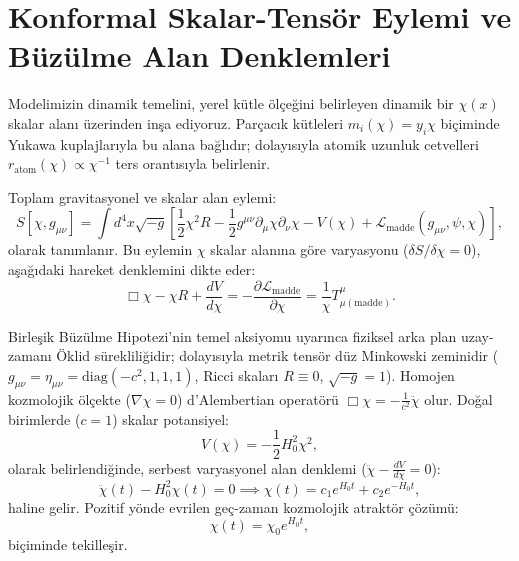 \documentclass[11pt,a4paper]{article}
\begin{document}
\section{Konformal Skalar-Tensör Eylemi ve Büzülme Alan Denklemleri}
\label{sec:eylem_ilkesi_kozmo}

Modelimizin dinamik temelini, yerel kütle ölçeğini belirleyen dinamik bir $\chi(x)$ skalar alanı üzerinden inşa ediyoruz. Parçacık kütleleri $m_i(\chi) = y_i \chi$ biçiminde Yukawa kuplajlarıyla bu alana bağlıdır; dolayısıyla atomik uzunluk cetvelleri $r_{\mathrm{atom}}(\chi) \propto \chi^{-1}$ ters orantısıyla belirlenir.

Toplam gravitasyonel ve skalar alan eylemi:
\begin{equation}
    S[\chi, g_{\mu\nu}] = \int d^4x \sqrt{-g} \left[ \frac{1}{2} \chi^2 R - \frac{1}{2} g^{\mu\nu} \partial_\mu \chi \partial_\nu \chi - V(\chi) + \mathcal{L}_{\mathrm{madde}}(g_{\mu\nu}, \psi, \chi) \right],
    \label{eq:konformal_eylem}
\end{equation}
olarak tanımlanır. Bu eylemin $\chi$ skalar alanına göre varyasyonu ($\delta S / \delta \chi = 0$), aşağıdaki hareket denklemini dikte eder:
\begin{equation}
    \Box \chi - \chi R + \frac{dV}{d\chi} = -\frac{\partial \mathcal{L}_{\mathrm{madde}}}{\partial \chi} = \frac{1}{\chi} T^\mu_{\mu(\mathrm{madde})}.
    \label{eq:chi_hareket}
\end{equation}

Birleşik Büzülme Hipotezi'nin temel aksiyomu uyarınca fiziksel arka plan uzay-zamanı Öklid sürekliliğidir; dolayısıyla metrik tensör düz Minkowski zeminidir ($g_{\mu\nu} = \eta_{\mu\nu} = \text{diag}(-c^2, 1, 1, 1)$, Ricci skaları $R \equiv 0$, $\sqrt{-g}=1$). Homojen kozmolojik ölçekte ($\nabla \chi = 0$) d'Alembertian operatörü $\Box \chi = -\frac{1}{c^2}\ddot{\chi}$ olur. Doğal birimlerde ($c=1$) skalar potansiyel:
\begin{equation}
    V(\chi) = -\frac{1}{2} H_0^2 \chi^2,
    \label{eq:potansiyel_secimi}
\end{equation}
olarak belirlendiğinde, serbest varyasyonel alan denklemi ($\ddot{\chi} - \frac{dV}{d\chi} = 0$):
\begin{equation}
    \ddot{\chi}(t) - H_0^2 \chi(t) = 0 \implies \chi(t) = c_1 e^{H_0 t} + c_2 e^{-H_0 t},
    \label{eq:chi_cozum}
\end{equation}
haline gelir. Pozitif yönde evrilen geç-zaman kozmolojik atraktör çözümü:
\begin{equation}
    \chi(t) = \chi_0 e^{H_0 t},
\end{equation}
biçiminde tekilleşir.
\end{document}
